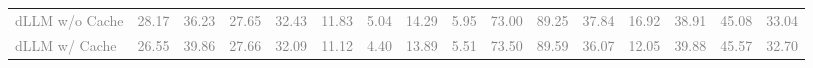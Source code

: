 \begin{table*}[t!]
{\begin{tabular}{@{}l*{15}{c}@{}}
        \midrule
\textcolor{gray}{dLLM w/o Cache} & \textcolor{gray}{28.17} & \textcolor{gray}{36.23} & \textcolor{gray}{27.65} & \textcolor{gray}{32.43} & \textcolor{gray}{11.83} & \textcolor{gray}{5.04} & \textcolor{gray}{14.29} & \textcolor{gray}{5.95} & \textcolor{gray}{73.00} & \textcolor{gray}{89.25} & \textcolor{gray}{37.84} & \textcolor{gray}{16.92} & \textcolor{gray}{38.91} & \textcolor{gray}{45.08} & \textcolor{gray}{33.04} \\
\textcolor{gray}{dLLM w/ Cache} & \textcolor{gray}{26.55} & \textcolor{gray}{39.86} & \textcolor{gray}{27.66} & \textcolor{gray}{32.09} & \textcolor{gray}{11.12} & \textcolor{gray}{4.40} & \textcolor{gray}{13.89} & \textcolor{gray}{5.51} & \textcolor{gray}{73.50} & \textcolor{gray}{89.59} & \textcolor{gray}{36.07} & \textcolor{gray}{12.05} & \textcolor{gray}{39.88} & \textcolor{gray}{45.57} & \textcolor{gray}{32.70} \\


\end{tabular}}
\end{table*}
